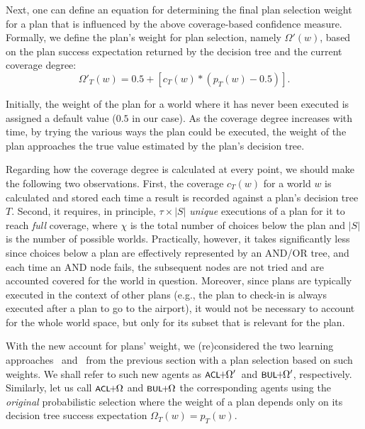 Next,	 one can define an equation for determining the final plan selection
weight for a plan that is influenced by the above coverage-based confidence measure.
Formally, we define the plan's weight for plan selection, namely $\Omega'(w)$, based
on the plan success expectation returned by the decision tree and the current
coverage degree:
%
\begin{equation*}\label{eqn:coverage}   
\Omega'_T(w) = 0.5 + \left[  c_T(w) *  \left( p_T(w) - 0.5 \right)  \right].
\end{equation*}
	
	
Initially, the weight of the plan for a world where it has never been executed is
assigned a default value ($0.5$ in our case).
As the coverage degree increases with time, by trying the various ways the plan
could be executed, the weight of the plan approaches the true value estimated by
the plan's decision tree.



Regarding how the coverage degree is calculated at every point, we should make
the following two observations.
First, the coverage $c_T(w)$ for a world $w$ is calculated and stored each time a
result is recorded against a plan's decision tree $T$.
Second, it requires, in principle, $\tau \times |S|$ \emph{unique} executions of
a plan for it to reach \emph{full} coverage, where $\chi$ is the total number of
choices below the plan and $|S|$ is the number of possible worlds. Practically,
however, it takes significantly less since choices below a plan are effectively
represented by an AND/OR tree, and each time an AND node fails, the subsequent
nodes are not tried and are accounted covered for the world in question.
Moreover, since plans are typically executed in the context of other plans
(e.g., the plan to check-in is always executed after a plan to go to the
airport), it would not be necessary to account for the whole world space, but
only for its subset that is relevant for the plan.

\newcommand{\CLSELA}{\mbox{$\CL\!\!+\!\!\Omega$}}
\newcommand{\CLSELB}{\mbox{$\CL\!\!+\!\!\Omega'$}}
\newcommand{\BULSELA}{\mbox{$\BUL\!\!+\!\!\Omega$}}
\newcommand{\BULSELB}{\mbox{$\BUL\!\!+\!\!\Omega'$}}

\medskip With the new account for plans' weight, we (re)considered the two
learning approaches \CL\ and \BUL\ from the previous section with a plan
selection based on such weights. We shall refer to such new agents as \CLSELB\
and \BULSELB, respectively.
Similarly, let us call $\CLSELA$ and $\BULSELA$ the corresponding agents using
the \emph{original} probabilistic selection where the weight of a plan depends
only on its decision tree success expectation $\Omega_T(w) = p_T(w)$.



